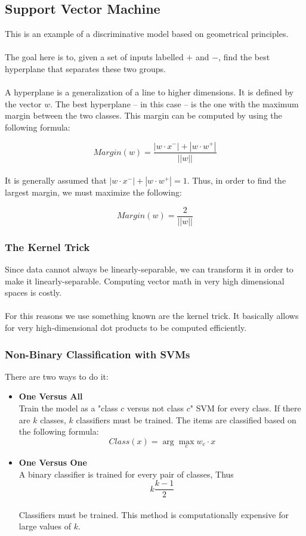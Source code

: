 \documentclass{article}
\begin{document}
\subsection{Support Vector Machine}
This is an example of a discriminative model based on geometrical principles. \\ \\
The goal here is to, given a set of inputs labelled $+$ and $-$, find the best hyperplane that separates these two groups. \\ \\
A hyperplane is a generalization of a line to higher dimensions. It is defined by the vector $w$. The best hyperplane -- in this case -- is the one with the maximum margin between the two classes. This margin can be computed by using the following formula:

\[ Margin(w) = \frac{|w \cdot x^{-}| + |w \cdot w^{+}|}{||w||} \] \\ 
It is generally assumed that $ |w \cdot x^{-}| + |w \cdot w^{+}| = 1 $. Thus, in order to find the largest margin, we must maximize the following:

\[ Margin(w) = \frac{2}{||w||} \]

\subsubsection{The Kernel Trick}
Since data cannot always be linearly-separable, we can transform it in order to make it linearly-separable. Computing vector math in very high dimensional spaces is costly. \\ \\
For this reasons we use something known are the kernel trick. It basically allows for very high-dimensional dot products to be computed efficiently.

\subsubsection{Non-Binary Classification with SVMs}
There are two ways to do it:

\begin{itemize}
	\item \textbf{One Versus All}
	\vspace{.2cm} \\
	Train the model as a "class $c$ versus not class $c$" SVM for every class. If there are $k$ classes, $k$ classifiers must be trained. The items are classified based on the following formula:
	\[ Class(x) = \arg \max_c w_c \cdot x \]
	
	\item \textbf{One Versus One}
	\vspace{.2cm} \\
	A binary classifier is trained for every pair of classes, Thus
	\[ k \frac{k-1}{2} \]\\
	Classifiers must be trained. This method is computationally expensive for large values of $k$.
\end{itemize}
\end{document}
